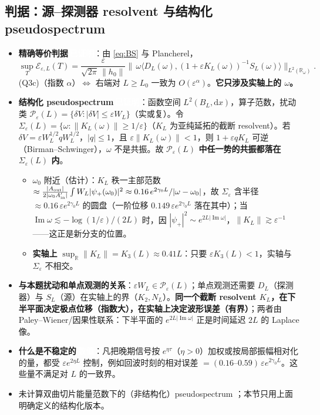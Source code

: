 \documentclass[11pt,a4paper,fontset=windows]{ctexart}
\newcommand{\tagbox}[2]{\begingroup\setlength{\fboxsep}{1.4pt}\colorbox{#1}{\textcolor{white}{\footnotesize\bfseries #2}}\endgroup}
\newcommand{\proven}{\tagbox{green!45!black}{已证明}}
\newcommand{\numer}{\tagbox{orange!85!black}{数值}}
\theoremstyle{definition}
\theoremstyle{definition}
\newcommand{\eps}{\varepsilon}
\newcommand{\cE}{\mathcal E}
\newcommand{\cP}{\mathcal P}
\newcommand{\Ain}{A_{\rm in}}
\newcommand{\Aout}{A_{\rm out}}
\renewcommand{\Im}{\operatorname{Im}}
\newcommand{\dd}{\mathrm d}
\begin{document}
\subsection{判据：源--探测器 resolvent 与结构化 pseudospectrum}
\begin{itemize}
\item \textbf{精确等价判据}\,\proven：由 \eqref{eq:BS} 与 Plancherel，
\[
\sup_T\cE_{\eps,L}(T)=\frac{\eps}{\sqrt{2\pi}\,\|h_0\|}\Big\|\,\omega\big\langle D_L(\omega),(1+\eps K_L(\omega))^{-1}S_L(\omega)\big\rangle\Big\|_{L^2(\mathbb R_\omega)} .
\]
(Q3c)（指数 $\alpha$）$\Leftrightarrow$ 右端对 $L\ge L_0$ 一致为 $O(\eps^\alpha)$。\textbf{它只涉及实轴上的 $\omega$。}
\item \textbf{结构化 pseudospectrum}\,\proven：函数空间 $L^2(B_L,\dd x)$，算子范数，扰动类 $\cP_\eps(L)=\{\delta V:|\delta V|\le\eps W_L\}$（实或复）。令 $\Sigma_\eps(L)=\{\omega:\|K_L(\omega)\|\ge1/\eps\}$（$K_L$ 为亚纯延拓的截断 resolvent）。若 $\delta V=\eps W_L^{1/2}qW_L^{1/2}$，$|q|\le1$，且 $\eps\|K_L(\omega)\|<1$，则 $1+\eps qK_L$ 可逆（Birman--Schwinger），$\omega$ 不是共振。故 \textbf{$\cP_\eps(L)$ 中任一势的共振都落在 $\Sigma_\eps(L)$ 内}。
 \begin{itemize}
 \item $\omega_0$ 附近（估计）：$K_L$ 秩一主部范数 $\approx\frac{|\Aout|}{2|\omega_0\Ain'|}\int W_L|\psi_+(\omega_0)|^2\approx0.16\,e^{2\gamma_0L}/|\omega-\omega_0|$，故 $\Sigma_\eps$ 含半径 $\approx0.16\,\eps e^{2\gamma_0L}$ 的圆盘（一阶位移 $0.149\,\eps e^{2\gamma_0L}$ 落在其中）；当 $\Im\omega\lesssim-\log(1/\eps)/(2L)$ 时，因 $|\psi_+|^2\sim e^{2L|\Im\omega|}$，$\|K_L\|\gtrsim\eps^{-1}$——这正是新分支的位置。
 \item \textbf{实轴上} $\sup_{\mathbb R}\|K_L\|=K_3(L)\approx0.41L$：只要 $\eps K_3(L)<1$，实轴与 $\Sigma_\eps$ 不相交。
 \end{itemize}
\item \textbf{与本题扰动和单点观测的关系}：$\eps W_L\in\cP_\eps(L)$；单点观测还需要 $D_L$（探测器）与 $S_L$（源）在实轴上的界（$K_2,N_L$）。\textbf{同一个截断 resolvent $K_L$，在下半平面决定极点位移（指数大），在实轴上决定波形误差（有界）}；两者由 Paley--Wiener/因果性联系：下半平面的 $e^{2L|\Im\omega|}$ 正是时间延迟 $2L$ 的 Laplace 像。
\item \textbf{什么是不稳定的}\,\numer：凡把晚期信号按 $e^{\eta\tau}$（$\eta>0$）加权或按局部振幅相对化的量，都受 $\eps e^{2\eta L}$ 控制，例如回波时刻的相对误差 $=(0.16\text{--}0.59)\,\eps e^{2\gamma_0L}$。这些量不满足对 $L$ 的一致界。
\item 未计算双曲切片能量范数下的（非结构化）pseudospectrum \cite{JMA}；本节只用上面明确定义的结构化版本。
\end{itemize}
\end{document}
